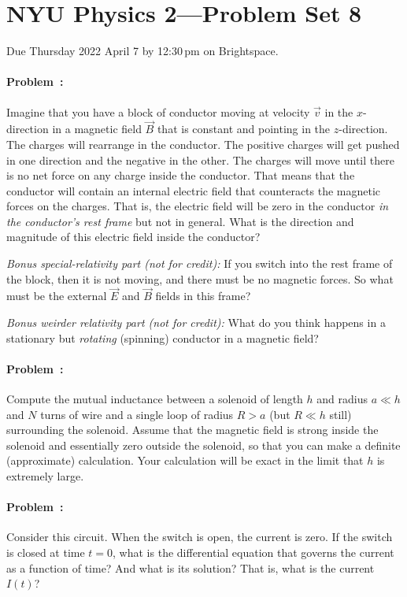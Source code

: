 \documentclass[12pt]{article}
\begin{document}
\section*{NYU Physics 2---Problem Set 8}

Due Thursday 2022 April 7 by 12:30\,pm on Brightspace.

\paragraph{Problem~\theproblem:}%
Imagine that you have a block of conductor moving at velocity
$\vec{v}$ in the $x$-direction in a magnetic field $\vec{B}$ that is
constant and pointing in the $z$-direction. The charges will rearrange
in the conductor. The positive charges will get pushed in one
direction and the negative in the other.
The charges will move until there is no net force on any
charge inside the conductor.
That means that the conductor will
contain an internal electric field that counteracts the magnetic
forces on the charges.
That is, the electric field will be zero in the conductor \emph{in the conductor's rest frame} but not in general.
What is the direction and magnitude of this
electric field inside the conductor?

\textsl{Bonus special-relativity part (not for credit):} If you switch
into the rest frame of the block, then it is not moving, and there
must be no magnetic forces. So what must be the external $\vec{E}$ and
$\vec{B}$ fields in this frame?

\textsl{Bonus weirder relativity part (not for credit):} What do you
think happens in a stationary but \emph{rotating} (spinning) conductor in a magnetic
field?

\paragraph{Problem~\theproblem:}%
Compute the mutual
inductance between a solenoid of length $h$ and radius $a\ll h$ and
$N$ turns of wire and a single loop of radius $R>a$ (but $R\ll h$
still) surrounding the solenoid. Assume that the magnetic field is
strong inside the solenoid and essentially zero outside the solenoid,
so that you can make a definite (approximate) calculation. Your
calculation will be exact in the limit that $h$ is extremely large.

\paragraph{Problem~\theproblem:}%
Consider this circuit.
When the switch is open, the current is zero. If the switch is closed
at time $t=0$, what is the differential equation that governs the
current as a function of time? And what is its solution? That is,
what is the current $I(t)$?
\end{document}
